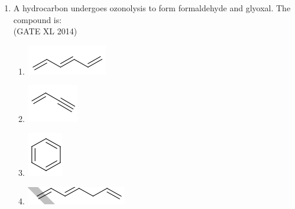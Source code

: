 \documentclass[journal,12pt,onecolumn]{IEEEtran}
\theoremstyle{remark}
\begin{document}
\begin{enumerate}
  \item A hydrocarbon undergoes ozonolysis to form formaldehyde and glyoxal. The compound is: \\
  \hfill (GATE XL 2014)\\
  \begin{multicols}{2}
  \begin{enumerate}
    \item \includegraphics[width=0.3\columnwidth]{fig16.png}
    \item \includegraphics[width=0.3\columnwidth]{fig17.png}
    \item \includegraphics[width=0.2\columnwidth]{fig18.png}
    \item \includegraphics[width=0.3\columnwidth]{fig19.png}
  \end{enumerate}
  \end{multicols}


\end{enumerate}
\end{document}
